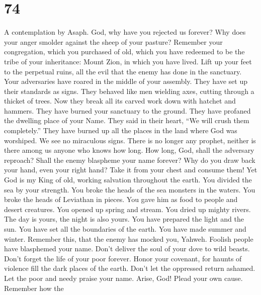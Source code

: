 \hypertarget{section-72}{%
\section{74}\label{section-72}}

A contemplation by Asaph.  God, why have you rejected us
forever? Why does your anger smolder against the sheep of your pasture?
 Remember your congregation, which you purchased of old,
which you have redeemed to be the tribe of your inheritance: Mount Zion,
in which you have lived.  Lift up your feet to the
perpetual ruins, all the evil that the enemy has done in the sanctuary.
 Your adversaries have roared in the middle of your
assembly. They have set up their standards as signs.  They
behaved like men wielding axes, cutting through a thicket of trees.
 Now they break all its carved work down with hatchet and
hammers.  They have burned your sanctuary to the ground.
They have profaned the dwelling place of your Name.  They
said in their heart, ``We will crush them completely.'' They have burned
up all the places in the land where God was worshiped.  We
see no miraculous signs. There is no longer any prophet, neither is
there among us anyone who knows how long.  How long, God,
shall the adversary reproach? Shall the enemy blaspheme your name
forever?  Why do you draw back your hand, even your right
hand? Take it from your chest and consume them!  Yet God
is my King of old, working salvation throughout the earth.
 You divided the sea by your strength. You broke the
heads of the sea monsters in the waters.  You broke the
heads of Leviathan in pieces. You gave him as food to people and desert
creatures.  You opened up spring and stream. You dried up
mighty rivers.  The day is yours, the night is also
yours. You have prepared the light and the sun.  You have
set all the boundaries of the earth. You have made summer and winter.
 Remember this, that the enemy has mocked you, Yahweh.
Foolish people have blasphemed your name.  Don't deliver
the soul of your dove to wild beasts. Don't forget the life of your poor
forever.  Honor your covenant, for haunts of violence
fill the dark places of the earth.  Don't let the
oppressed return ashamed. Let the poor and needy praise your name.
 Arise, God! Plead your own cause. Remember how the
